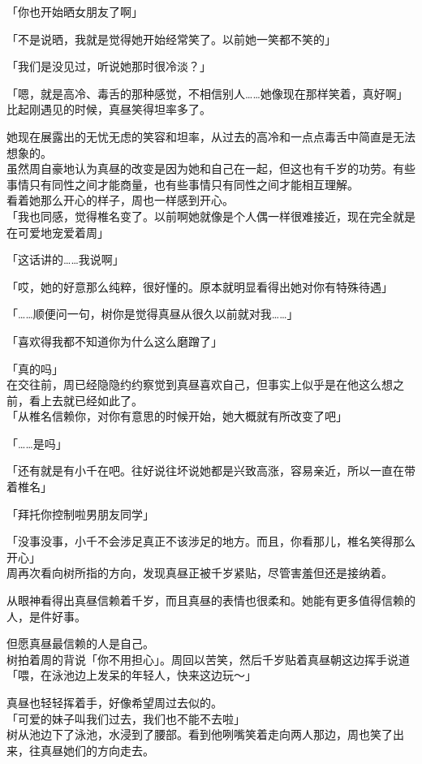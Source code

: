 「你也开始晒女朋友了啊」

「不是说晒，我就是觉得她开始经常笑了。以前她一笑都不笑的」

「我们是没见过，听说她那时很冷淡？」

「嗯，就是高冷、毒舌的那种感觉，不相信别人……她像现在那样笑着，真好啊」\\

比起刚遇见的时候，真昼笑得坦率多了。

她现在展露出的无忧无虑的笑容和坦率，从过去的高冷和一点点毒舌中简直是无法想象的。\\

虽然周自豪地认为真昼的改变是因为她和自己在一起，但这也有千岁的功劳。有些事情只有同性之间才能商量，也有些事情只有同性之间才能相互理解。\\

看着她那么开心的样子，周也一样感到开心。\\

「我也同感，觉得椎名变了。以前啊她就像是个人偶一样很难接近，现在完全就是在可爱地宠爱着周」

「这话讲的……我说啊」

「哎，她的好意那么纯粹，很好懂的。原本就明显看得出她对你有特殊待遇」

「……顺便问一句，树你是觉得真昼从很久以前就对我……」

「喜欢得我都不知道你为什么这么磨蹭了」

「真的吗」\\

在交往前，周已经隐隐约约察觉到真昼喜欢自己，但事实上似乎是在他这么想之前，看上去就已经如此了。\\

「从椎名信赖你，对你有意思的时候开始，她大概就有所改变了吧」

「……是吗」

「还有就是有小千在吧。往好说往坏说她都是兴致高涨，容易亲近，所以一直在带着椎名」

「拜托你控制啦男朋友同学」

「没事没事，小千不会涉足真正不该涉足的地方。而且，你看那儿，椎名笑得那么开心」\\

周再次看向树所指的方向，发现真昼正被千岁紧贴，尽管害羞但还是接纳着。

从眼神看得出真昼信赖着千岁，而且真昼的表情也很柔和。她能有更多值得信赖的人，是件好事。

但愿真昼最信赖的人是自己。\\

树拍着周的背说「你不用担心」。周回以苦笑，然后千岁贴着真昼朝这边挥手说道「喂，在泳池边上发呆的年轻人，快来这边玩～」

真昼也轻轻挥着手，好像希望周过去似的。\\

「可爱的妹子叫我们过去，我们也不能不去啦」\\

树从池边下了泳池，水浸到了腰部。看到他咧嘴笑着走向两人那边，周也笑了出来，往真昼她们的方向走去。
